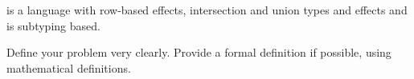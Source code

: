 
\core is a language with row-based effects, intersection and union types and effects and is subtyping based. 

Define your problem very clearly. Provide a formal definition if possible, using mathematical definitions.
